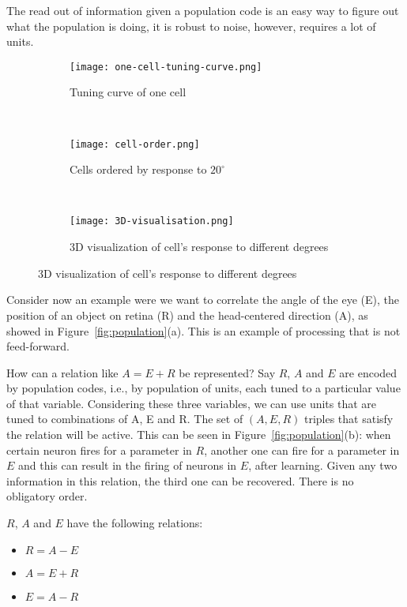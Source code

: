 \documentclass[main]{subfiles}
\begin{document}
The read out of information given a population code is an easy way to figure out what the population is doing, it is robust to noise, however, requires a lot of units.

\begin{figure}[H]
	\centering
	\begin{subfigure}[b]{0.3\textwidth}
		\centering
		\texttt{[image: one-cell-tuning-curve.png]}
		\caption{Tuning curve of one cell}
	\end{subfigure}%
	~
	\begin{subfigure}[b]{0.3\textwidth}
		\centering
		\texttt{[image: cell-order.png]}
		\caption{Cells ordered by response to $20^\circ$}
	\end{subfigure}
	~ 
	\begin{subfigure}[b]{0.3\textwidth}
		\centering
		\texttt{[image: 3D-visualisation.png]}
		\caption{3D visualization of cell's response to different degrees}
		\label{fig:tuning-curves}
	\end{subfigure}
\end{figure}

Consider now an example were we want to correlate the angle of the eye (E), the position of an object on retina (R) and the head-centered direction (A), as showed in Figure~\ref{fig:population}(a).
This is an example of processing that is not feed-forward.

How can a relation like $A = E + R$ be represented?
Say $R$, $A$ and $E$ are encoded by population codes, i.e., by population of units, each tuned to a particular value of that variable. Considering these three variables, we can use units that are tuned to combinations of A, E and R.
The set of $(A, E, R)$ triples that satisfy the relation will be active.
This can be seen in Figure~\ref{fig:population}(b): when certain neuron fires for a parameter in $R$, another one can fire for a parameter in $E$ and this can result in the firing of neurons in $E$, after learning.
Given any two information in this relation, the third one can be recovered. There is no obligatory order.

$R$, $A$ and $E$ have the following relations:
\begin{itemize}
\item $R = A - E$
\item $A = E + R$
\item $E = A - R$
\end{itemize}
\end{document}
